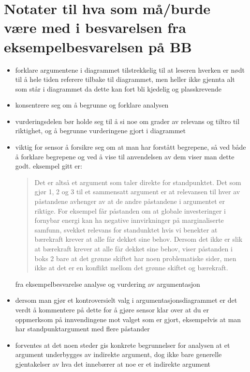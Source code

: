 \documentclass[a4paper,11pt,norsk]{article}
\begin{document}
\section*{Notater til hva som må/burde være med i besvarelsen fra eksempelbesvarelsen på BB}
\begin{itemize}
    \item forklare argumentene i diagrammet tilstrekkelig til at leseren hverken er nødt til å hele tiden referere tilbake til diagrammet, men 
        heller ikke gjennta alt som står i diagrammet da dette kan fort bli kjedelig og plasskrevende
    \item konsentrere seg om å begrunne og forklare analysen
    \item vurderingsdelen bør holde seg til å si noe om grader av relevans og tiltro til riktighet, og 
        å begrunne vurderingene gjort i diagrammet

    \item viktig for sensor å forsikre seg om at man har forstått begrepene, så ved både å forklare 
        begrepene og ved å vise til anvendelsen av dem viser man dette godt. eksempel gitt er:
        \begin{quote}
            Det er altså et argument som taler direkte for standpunktet. Det som gjør 1, 2 og 3 til et sammensatt argument er at relevansen til hver av påstandene avhenger av at de andre påstandene i argumentet er riktige. For eksempel får påstanden om at globale investeringer i fornybar energi kan ha negative innvirkninger på marginaliserte samfunn, svekket relevans for standunktet hvis vi benekter at bærekraft krever at alle får dekket sine behov. Dersom det ikke er slik at bærekraft krever at alle får dekket sine behov, viser påstanden i boks 2 bare at det grønne skiftet har noen problematiske sider, men ikke at det er en konflikt mellom det grønne skiftet og bærekraft.
        \end{quote}
        fra eksempelbesvarelse analyse og vurdering av argumentasjon

    \item dersom man gjør et kontroversielt valg i argumentasjonsdiagrammet er det verdt å kommentere på dette 
        for å gjøre sensor klar over at du er oppmerksom på innvendingene mot valget som er gjort, eksempelvis at man 
        har standpunktargument med flere påstander
    \item forventes at det noen steder gis konkrete begrunnelser for analysen at et argument underbygges av 
        indirekte argument, dog ikke bare generelle gjentakelser av hva det innebærer at noe er et indirekte argument
\end{itemize}
\end{document}
